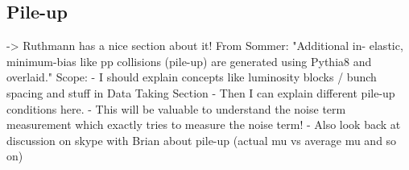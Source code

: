 


\subsection{Pile-up}


->  Ruthmann has a nice section about it!
From Sommer: "Additional in- elastic, minimum-bias like pp collisions (pile-up) are generated using Pythia8 and overlaid."
Scope:
- I should explain concepts like luminosity blocks  / bunch spacing and stuff in Data Taking Section
- Then I can explain different pile-up conditions here.
- This will be valuable to understand the noise term measurement which exactly tries to measure the noise term!
- Also look back at discussion on skype with Brian about pile-up (actual mu vs average mu and so on)
